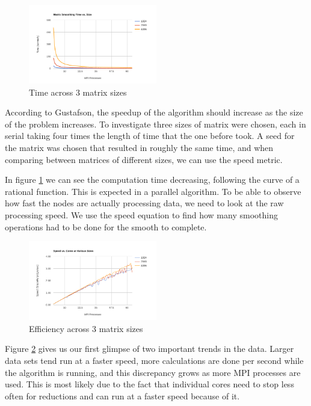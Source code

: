 \documentclass[a4paper,10pt]{report}
\begin{document}
\begin{figure}
 \centering
 \includegraphics[width=0.5\textwidth]{./images/sizes-time.png}
 \caption{Time across 3 matrix sizes}
 \label{fig:sizestime}
\end{figure}

According to Gustafson, the speedup of the algorithm should increase as the size of the problem increases. To investigate three sizes of matrix were chosen, each in serial taking four times the length of time that the one before took. A seed for the matrix was chosen that resulted in roughly the same time, and when comparing between matrices of different sizes, we can use the speed metric.

In figure \ref{fig:sizestime} we can see the computation time decreasing, following the curve of a rational function. This is expected in a parallel algorithm. To be able to observe how fast the nodes are actually processing data, we need to look at the raw processing speed. We use the speed equation to find how many smoothing operations had to be done for the smooth to complete.

\begin{figure}
 \centering
 \includegraphics[width=0.5\textwidth]{./images/sizes-speed.png}
 \caption{Efficiency across 3 matrix sizes}
 \label{fig:sizespeed}
\end{figure}

Figure \ref{fig:sizespeed} gives us our first glimpse of two important trends in the data. Larger data sets tend run at a faster speed, more calculations are done per second while the algorithm is running, and this discrepancy grows as more MPI processes are used. This is most likely due to the fact that individual cores need to stop less often for reductions and can run at a faster speed because of it.
\end{document}
